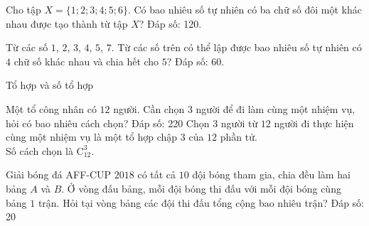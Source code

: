 \begin{vd}%
	Cho tập $X=\{1; 2; 3; 4; 5; 6\}$. Có bao nhiêu số tự nhiên có ba chữ số đôi một khác nhau được tạo thành từ tập $X$? 
	\hspace*{5cm} {\sf\fontsize{10pt}{1pt}\selectfont Đáp số: 120.}
\end{vd} 

\begin{vd}%
	Từ các số $1$, $2$, $3$, $4$, $5$, $7$. Từ các số trên có thể lập được bao nhiêu số tự nhiên có $4$ chữ số khác nhau và chia hết cho $5$?
	\hspace*{5cm} {\sf\fontsize{10pt}{1pt}\selectfont Đáp số: 60.}
\end{vd} 

\begin{dang}{Tổ hợp và số tổ hợp}
	
\end{dang}
\begin{vd}%
	Một tổ công nhân có $12$ người. Cần chọn $3$ người để đi làm cùng một nhiệm vụ, hỏi có bao nhiêu cách chọn?
	\hspace*{6cm} {\sf\fontsize{10pt}{1pt}\selectfont Đáp số: 220 }
	\loigiai
	{Chọn $3$ người từ $12$ người đi thực hiện cùng một nhiệm vụ là một tổ hợp chập $3$ của $12$ phần tử.\\
		Số cách chọn là $\mathrm{C}_{12}^3$.
	}
\end{vd} 
\begin{vd}%
	Giải bóng đá AFF-CUP $2018$ có tất cả $10$ đội bóng tham gia, chia đều làm hai bảng $A$ và $B$. Ở vòng đấu bảng, mỗi đội bóng thi đấu với mỗi đội bóng cùng bảng $1$ trận. Hỏi tại vòng bảng các đội thi đấu tổng cộng bao nhiêu trận?	
	\hspace*{3cm} {\sf\fontsize{10pt}{1pt}\selectfont Đáp số: 20}
\end{vd} 

